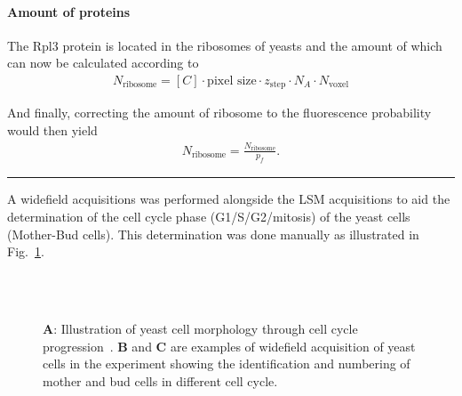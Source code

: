 \paragraph{Amount of proteins}
The Rpl3 protein is located in the ribosomes of yeasts and the amount of which can now be calculated according to
\begin{align} 
N_{\text{ribosome}} = [C] \cdot \text{pixel size} \cdot z_{\text{step}} \cdot N_{A} \cdot N_{\text{voxel}}
\end{align}

And finally, correcting the amount of ribosome to the fluorescence probability would then yield
\begin{align} 
N_{\text{ribosome}} = \frac{N_{\text{ribosome}}}{p_f}.
\end{align}

\begin{center}
\par\noindent\rule{0.8\textwidth}{0.4pt}
\end{center}

A widefield acquisitions was performed alongside the LSM acquisitions to aid the determination of the cell cycle phase (G1/S/G2/mitosis) of the yeast cells (Mother-Bud cells). This determination was done manually as illustrated in Fig.~\ref{fig:wideyeast}. 

\begin{figure}[!h]
\centering
\captionsetup[subfigure]{position=top}
\\\vspace{-0.7em}
\captionsetup[subfigure]{position=bottom}
\hspace{0.1mm}
\\
\caption{\textbf{A}: Illustration of yeast cell morphology through cell cycle progression~\cite{Yu2011}. 
\textbf{B} and \textbf{C} are examples of widefield acquisition of yeast cells in the experiment showing the identification and numbering of mother and bud cells in different cell cycle.}
\label{fig:wideyeast}
\end{figure}

